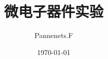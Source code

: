 \documentclass[cn,11pt,chinese,black,simple]{elegantbook}
\title{微电子器件实验}
\author{Pannenets.F}
\date{\today}
\begin{document}
\maketitle
\frontmatte
\end{document}
